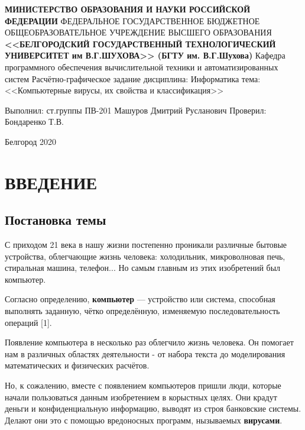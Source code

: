 \documentclass[12pt]{article}
\def\l{\linebreak}
\begin{document}
\begin{center}

    \textbf{МИНИСТЕРСТВО ОБРАЗОВАНИЯ И НАУКИ
    РОССИЙСКОЙ ФЕДЕРАЦИИ} \l
    ФЕДЕРАЛЬНОЕ ГОСУДАРСТВЕННОЕ БЮДЖЕТНОЕ ОБЩЕОБРАЗОВАТЕЛЬНОЕ УЧРЕЖДЕНИЕ
    ВЫСШЕГО ОБРАЗОВАНИЯ \l
    \textbf{<<БЕЛГОРОДСКИЙ ГОСУДАРСТВЕННЫЙ
    ТЕХНОЛОГИЧЕСКИЙ УНИВЕРСИТЕТ им В.Г.ШУХОВА>> \l
    (БГТУ им. В.Г.Шухова)}
    \l \l
    Кафедра программного обеспечения вычислительной техники и 
    автоматизированных систем
    \l \l \l  
    Расчётно-графическое задание \l
    дисциплина: Информатика \l
    тема: <<Компьютерные вирусы, их свойства и классификация>> \l
    
\hfill

\begin{flushright}
    Выполнил: ст.группы ПВ-201 \l
    Машуров Дмитрий Русланович \l
    Проверил: Бондаренко Т.В. 
\end{flushright}

    Белгород 2020
    
\end{center}
\thispagestyle{empty}

\tableofcontents
\thispagestyle{empty}

\newpage
\setcounter{page}{1}
\section*{ВВЕДЕНИЕ}

\subsection*{Постановка темы}

С приходом 21 века в нашу жизни постепенно проникали различные бытовые устройства, облегчающие жизнь человека: холодильник, микроволновая печь, стиральная машина, телефон... Но самым главным из этих изобретений был компьютер.

Согласно определению, \textbf{компьютер} — устройство или система, способная выполнять заданную, чётко определённую, изменяемую последовательность операций [1].

Появление компьютера в несколько раз облегчило жизнь человека. Он помогает нам в различных областях деятельности - от набора текста до моделирования математических и физических расчётов.

Но, к сожалению, вместе с появлением компьютеров пришли люди, которые начали пользоваться данным изобретением в корыстных целях. Они крадут деньги и конфиденциальную информацию, выводят из строя банковские системы. Делают они это с помощью вредоносных программ, нызываемых \textbf{вирусами}.
\end{document}

